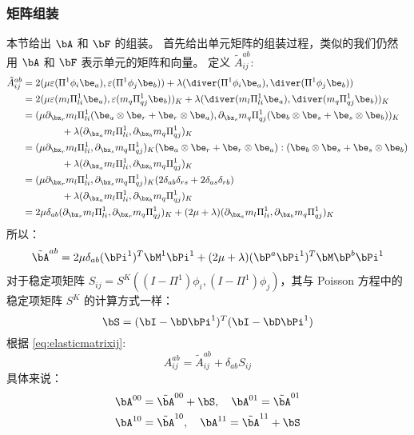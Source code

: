 \subsubsection{矩阵组装}
本节给出 $\bA$ 和 $\bF$ 的组装。
首先给出单元矩阵的组装过程，类似的我们仍然用 $\bA$ 和 $\bF$
表示单元的矩阵和向量。
定义 $\tilde{A}_{ij}^{ab}$:
$$
\begin{aligned}
\tilde{A}_{ij}^{ab} 
& = 2(\mu\varepsilon(\Pi^1 \phi_i\be_a), \varepsilon(\Pi^1 \phi_j\be_b))
  + \lambda(\diver(\Pi^1 \phi_i\be_a), \diver(\Pi^1 \phi_j\be_b))\\
& = 2(\mu\varepsilon(m_l\Pi^1_{li}\be_a), \varepsilon(m_q\Pi^1_{qj}\be_b))_K
+ \lambda(\diver(m_l\Pi^1_{li}\be_a), \diver(m_q\Pi^1_{qj}\be_b))_K\\ 
& = (\mu\partial_{\bx_r}m_l\Pi^1_{li}(\be_a\otimes \be_r + \be_r\otimes \be_a), 
\partial_{\bx_s}m_q\Pi^1_{qj}(\be_b\otimes \be_s + \be_s\otimes \be_b))_K\\
& \qquad\qquad + \lambda(\partial_{\bx_a}m_l\Pi^1_{li}, \partial_{\bx_b}m_q\Pi^1_{qj})_K\\
& = (\mu\partial_{\bx_r}m_l\Pi^1_{li}, \partial_{\bx_s}m_q\Pi^1_{qj})_K(\be_a\otimes
\be_r + \be_r\otimes \be_a):(\be_b\otimes \be_s + \be_s\otimes \be_b)\\
& \qquad\qquad + \lambda(\partial_{\bx_a}m_l\Pi^1_{li}, \partial_{\bx_b}m_q\Pi^1_{qj})_K\\
& = (\mu\partial_{\bx_r}m_l\Pi^1_{li}, \partial_{\bx_s}m_q\Pi^1_{qj})_K
(2\delta_{ab}\delta_{rs} + 2\delta_{as}\delta_{rb})\\
& \qquad\qquad + \lambda(\partial_{\bx_a}m_l\Pi^1_{li}, \partial_{\bx_b}m_q\Pi^1_{qj})_K\\
& = 2\mu\delta_{ab}(\partial_{\bx_r}m_l\Pi^1_{li}, \partial_{\bx_r}m_q\Pi^1_{qj})_K
+ (2\mu+\lambda)(\partial_{\bx_a}m_l\Pi^1_{li}, \partial_{\bx_b}m_q\Pi^1_{qj})_K\\
\end{aligned}
$$
所以：
$$
\tilde{\bA}^{ab} = 2\mu\delta_{ab}(\bPi^1)^T\bM^1\bPi^1 + 
(2\mu + \lambda)(\bP^a\bPi^1)^T\bM\bP^{b}\bPi^1
$$
对于稳定项矩阵 $S_{ij} = S^K((I - \Pi^1)\phi_i, (I - \Pi^1)\phi_j)$，其与
Poisson 方程中的稳定项矩阵 $S^K$ 的计算方式一样：
$$
\bS = (\bI - \bD\bPi^1)^T(\bI - \bD\bPi^1)
$$
根据 \eqref{eq:elasticmatrixij}:
$$
A_{ij}^{ab} = \tilde{A}_{ij}^{ab} + \delta_{ab}S_{ij}
$$
具体来说：
$$
\begin{aligned}
    \bA^{00} & = \tilde{\bA}^{00} + \bS, \quad \bA^{01} = \tilde{\bA}^{01}\\
    \bA^{10} & = \tilde{\bA}^{10}, \quad \bA^{11} = \tilde{\bA}^{11} + \bS
\end{aligned}
$$
